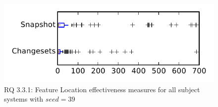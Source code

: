 
\begin{figure}
\centering
\includegraphics[height=0.4\textheight]{figures/flt_seed/rq1_tiny_39}
\caption{RQ 3.3.1: Feature Location effectiveness measures for all subject systems with $seed=39$}
\label{fig:flt_seed:rq1:tiny}
\end{figure}
